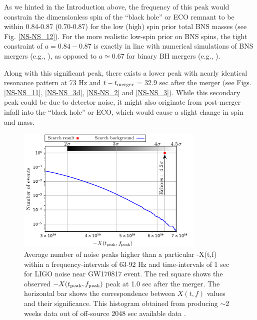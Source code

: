 \documentclass[12pt]{article}
\begin{document}
As we hinted in the Introduction above, the frequency of this peak would constrain the dimensionless spin of the ``black hole'' or ECO remnant to be within 0.84-0.87 (0.70-0.87) for the low (high) spin prior total BNS masses \cite{TheLIGOScientific:2017qsa} (see Fig. \ref{NS-NS_12}). For the more realistic low-spin prior on BNS spins, the tight constraint of $a=0.84-0.87$  is exactly in line with numerical simulations of BNS mergers (e.g., \cite{Kastaun:2013mv}), as opposed to $a\simeq 0.67$ for binary BH mergers (e.g., \cite{TheLIGOScientific:2016pea}). 

Along with this significant peak, there exists a lower peak with nearly identical resonance pattern at 73 Hz and $t-t_{\rm{merger}}$ = 32.9 sec after the merger (see Figs. \ref{NS-NS_11}, \ref{NS-NS_3d}, \ref{NS-NS_2} and \ref{NS-NS_3}). While this secondary peak could be due to detector noise, it might also originate from post-merger infall into the ``black hole'' or ECO, which would cause a slight change in spin and mass.

\begin{figure}[!tbp]
\centering
    \includegraphics[width=0.8\textwidth]{Histogram.pdf}
 \caption{Average number of noise peaks higher than a particular -X(t,f) within a frequency-intervals of 63-92 Hz and time-intervals of 1 sec for LIGO noise near GW170817 event. The red square shows the observed $-X(t_{\rm{peak}},f_{\rm{peak}})$ peak at 1.0 sec after the merger. The horizontal bar shows the correspondence between $X(t,f)$ values and their significance. This histogram obtained from producing $\sim$2 weeks data out of off-source 2048 sec available data \cite{GW170817}.}
 \label{NS-NS_10}
\end{figure}
\end{document}
